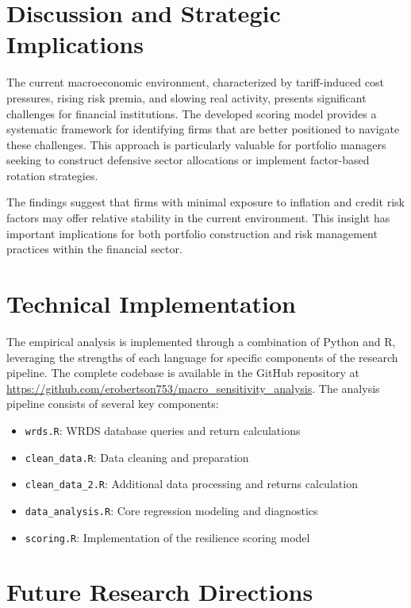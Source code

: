 \documentclass[12pt]{article}
\begin{document}
\section{Discussion and Strategic Implications}

The current macroeconomic environment, characterized by tariff-induced cost pressures, rising risk premia, and slowing real activity, presents significant challenges for financial institutions. The developed scoring model provides a systematic framework for identifying firms that are better positioned to navigate these challenges. This approach is particularly valuable for portfolio managers seeking to construct defensive sector allocations or implement factor-based rotation strategies.

The findings suggest that firms with minimal exposure to inflation and credit risk factors may offer relative stability in the current environment. This insight has important implications for both portfolio construction and risk management practices within the financial sector.

\section{Technical Implementation}

The empirical analysis is implemented through a combination of Python and R, leveraging the strengths of each language for specific components of the research pipeline. The complete codebase is available in the GitHub repository at \url{https://github.com/erobertson753/macro_sensitivity_analysis}. The analysis pipeline consists of several key components:

\begin{itemize}
    \item \texttt{wrds.R}: WRDS database queries and return calculations
    \item \texttt{clean\_data.R}: Data cleaning and preparation
    \item \texttt{clean\_data\_2.R}: Additional data processing and returns calculation
    \item \texttt{data\_analysis.R}: Core regression modeling and diagnostics
    \item \texttt{scoring.R}: Implementation of the resilience scoring model
\end{itemize}

\section{Future Research Directions}
\end{document}
